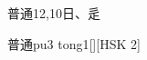 \begin{entry}{普通}{12,10}{⽇、⾡}
  \begin{phonetics}{普通}{pu3 tong1}[][HSK 2]
  \end{phonetics}
\end{entry}
